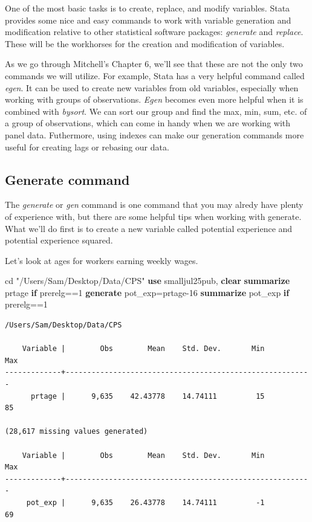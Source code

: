 \documentclass[
]{book}
\newenvironment{Shaded}{\begin{snugshade}}{\end{snugshade}}
\newcommand{\KeywordTok}[1]{\textcolor[rgb]{0.13,0.29,0.53}{\textbf{#1}}}
\newcommand{\NormalTok}[1]{#1}
\newcommand{\StringTok}[1]{\textcolor[rgb]{0.31,0.60,0.02}{#1}}
\begin{document}
One of the most basic tasks is to create, replace, and modify variables. Stata provides some nice and easy commands to work with variable generation and modification relative to other statistical software packages: \emph{generate} and \emph{replace}. These will be the workhorses for the creation and modification of variables.

As we go through Mitchell's Chapter 6, we'll see that these are not the only two commands we will utilize. For example, Stata has a very helpful command called \emph{egen}. It can be used to create new variables from old variables, especially when working with groups of observations. \emph{Egen} becomes even more helpful when it is combined with \emph{bysort}. We can sort our group and find the max, min, sum, etc. of a group of observations, which can come in handy when we are working with panel data. Futhermore, using indexes can make our generation commands more useful for creating lags or rebasing our data.

\subsection{Generate command}\label{generate-command}

The \emph{generate} or \emph{gen} command is one command that you may alredy have plenty of experience with, but there are some helpful tips when working with generate. What we'll do first is to create a new variable called potential experience and potential experience squared.

Let's look at ages for workers earning weekly wages.

\begin{Shaded}
\begin{Highlighting}[]
\NormalTok{cd }\StringTok{"/Users/Sam/Desktop/Data/CPS"}
\KeywordTok{use}\NormalTok{ smalljul25pub, }\KeywordTok{clear}
\KeywordTok{summarize}\NormalTok{ prtage }\KeywordTok{if}\NormalTok{ prerelg==1}
\KeywordTok{generate}\NormalTok{ pot\_exp=prtage{-}16}
\KeywordTok{summarize}\NormalTok{ pot\_exp }\KeywordTok{if}\NormalTok{ prerelg==1}
\end{Highlighting}
\end{Shaded}

\begin{verbatim}
/Users/Sam/Desktop/Data/CPS

    Variable |        Obs        Mean    Std. Dev.       Min        Max
-------------+---------------------------------------------------------
      prtage |      9,635    42.43778    14.74111         15         85

(28,617 missing values generated)

    Variable |        Obs        Mean    Std. Dev.       Min        Max
-------------+---------------------------------------------------------
     pot_exp |      9,635    26.43778    14.74111         -1         69
\end{verbatim}
\end{document}
